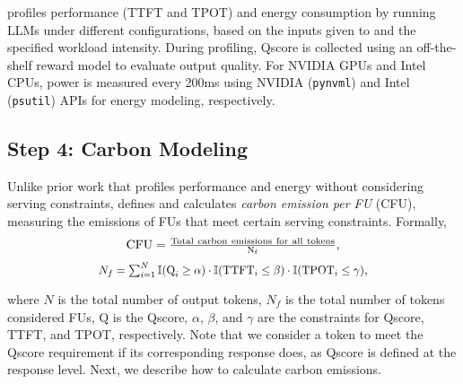 \SYSTEM{} profiles performance (TTFT and TPOT) and energy consumption by running LLMs under different configurations, based on the inputs given to \SYSTEM{} and the specified workload intensity. During profiling, Qscore is collected using an off-the-shelf reward model to evaluate output quality. For NVIDIA GPUs and Intel CPUs, power is measured every 200ms using NVIDIA (\verb|pynvml|) and Intel (\verb|psutil|) APIs for energy modeling, respectively.

\subsection{Step 4: Carbon Modeling}

Unlike prior work that profiles performance and energy without considering serving constraints, \SYSTEM{} defines and calculates \emph{carbon emission per FU} (CFU), measuring the emissions of FUs that meet certain serving constraints. Formally,
\[\Scale[0.99]{
\rm{CFU} = \frac{\rm{Total~carbon~emissions~for~all~tokens}}{N_{f}},}
 \]
\[ \Scale[0.9]{ N_{f} = \sum_{i=1}^N \mathbb{I}(\text{Q}_i \geq \alpha) \cdot \mathbb{I}(\text{TTFT}_i \leq \beta) \cdot \mathbb{I}(\text{TPOT}_i \leq \gamma) },\]


\noindent where $N$ is the total number of output tokens, \( N_{f} \) is the total number of tokens considered FUs, $\text{Q}$ is the Qscore, $\alpha$, $\beta$, and $\gamma$ are the constraints for Qscore, TTFT, and TPOT, respectively. Note that we consider a token to meet the Qscore requirement if its corresponding response does, as Qscore is defined at the response level. Next, we describe how to calculate carbon emissions.


